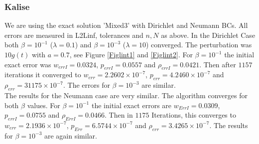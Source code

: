 \documentclass[11pt, a4paper]{article}
\theoremstyle{definition}
\begin{document}
\subsubsection*{Kalise}
We are using the exact solution 'Mixed3' with Dirichlet and Neumann BCs. All errors are measured in L2Linf, tolerances and $n,N$ as above.
In the Dirichlet Case both $\beta = 10^{-1}$ ($\lambda =0.1$) and $\beta = 10^{-3}$ ($\lambda =10$) converged. The perturbation was $10g(t)$ with $a=0.7$, see Figure \ref{Figlint1} and \ref{Figlint2}.
For $\beta=10^{-1}$ the initial exact error was $w_{errI}= 0.0324$, $p_{errI} = 0.0557$ and $\rho_{errI}= 0.0421$. Then after $1157$ iterations it converged to $w_{err}= 2.2602 \times  10^{-7}$, $p_{err} = 4.2460 \times 10^{-7}$ and $\rho_{err} = 31175 \times 10^{-7}$. The errors for $\beta = 10^{-3}$ are similar.\\
The results for the Neumann case are very similar. The algorithm converges for both $\beta$ values. 
For $\beta = 10^{-1}$ the initial exact errors are $w_{ErrI}=0.0309$, $p_{errI} = 0.0755$ and $\rho_{ErrI}= 0.0466$. Then in $1175$ Iterations, this converges to $w_{err}= 2.1936 \times 10^{-7}$, $p_{Err}=6.5744 \times 10^{-7}$ and $\rho_{err} = 3.4265 \times 10^{-7}$. The results for $\beta = 10^{-3}$ are again similar.\\
\end{document}
